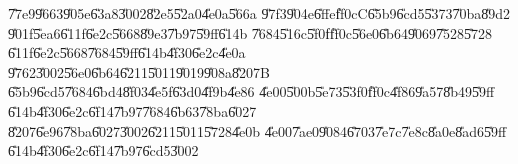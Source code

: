 \U{77e9}\U{9663}\U{905e}\U{63a8}\U{3002}\U{82e5}\U{52a0}\U{4e0a}\U{566a}%
\U{97f3}\U{904e}\U{6ffe}\U{ff0c}C\U{65b9}\U{6cd5}\U{5373}\U{70ba}\U{89d2}%
\U{901f}\U{5ea6}\U{611f}\U{6e2c}\U{5668}\U{89e3}\U{7b97}\U{59ff}\U{614b}%
\U{7684}\U{516c}\U{5f0f}\U{ff0c}\U{56e0}\U{6b64}\U{9069}\U{7528}\U{5728}%
\U{611f}\U{6e2c}\U{5668}\U{7684}\U{59ff}\U{614b}\U{4f30}\U{6e2c}\U{4e0a}%
\U{9762}\U{3002}\U{56e0}\U{6b64}\U{6211}\U{5011}\U{9019}\U{908a}\U{8207}B%
\U{65b9}\U{6cd5}\U{7684}\U{6bd4}\U{8f03}\U{4e5f}\U{63d0}\U{4f9b}\U{4e86}%
\U{4e00}\U{500b}\U{5e73}\U{53f0}\U{ff0c}\U{4f86}\U{9a57}\U{8b49}\U{59ff}%
\U{614b}\U{4f30}\U{6e2c}\U{6f14}\U{7b97}\U{7684}\U{6b63}\U{78ba}\U{6027}%
\U{8207}\U{6e96}\U{78ba}\U{6027}\U{3002}\U{6211}\U{5011}\U{5728}\U{4e0b}%
\U{4e00}\U{7ae0}\U{9084}\U{6703}\U{7e7c}\U{7e8c}\U{8a0e}\U{8ad6}\U{59ff}%
\U{614b}\U{4f30}\U{6e2c}\U{6f14}\U{7b97}\U{6cd5}\U{3002}

\bigskip

